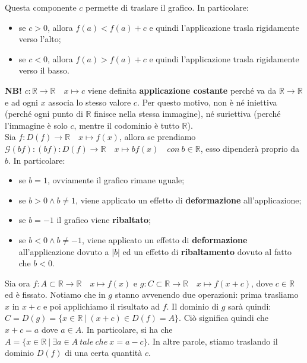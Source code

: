 \documentclass{article}
\begin{document}
\noindent Questa componente $c$ permette di traslare il grafico. In particolare:

\begin{itemize}
    \item se $c > 0$, allora $f(a) < f(a) + c$ e quindi l'applicazione trasla rigidamente verso l'alto;
    \item se $c < 0$, allora $f(a) > f(a) + c$ e quindi l'applicazione trasla rigidamente verso il basso.
\end{itemize}

\noindent\textbf{NB!} $c: \mathbb{R} \xrightarrow{} \mathbb{R} \quad x \longmapsto c$ viene definita \textbf{applicazione costante} perché va da $\mathbb{R} \xrightarrow{} \mathbb{R}$ e ad ogni $x$ associa lo stesso valore $c$. Per questo motivo, non è né iniettiva (perché ogni punto di $\mathbb{R}$ finisce nella stessa immagine), né suriettiva (perché l'immagine è solo $c$, mentre il codominio è tutto $\mathbb{R}$).\\

\noindent Sia $f: D(f) \xrightarrow{} \mathbb{R} \quad x \longmapsto f(x)$, allora se prendiamo $\mathcal{G}(bf): (bf): D(f) \xrightarrow{} \mathbb{R} \quad x \longmapsto bf(x) \quad con \ b \in \mathbb{R}$, esso dipenderà proprio da $b$. In particolare: 

\begin{itemize}
    \item se $b = 1$, ovviamente il grafico rimane uguale;
    \item se $b > 0 \wedge b \neq 1$, viene applicato un effetto di \textbf{deformazione} all'applicazione;
    \item se $b = -1$ il grafico viene \textbf{ribaltato};
    \item se $b < 0 \wedge b \neq -1$, viene applicato un effetto di \textbf{deformazione} all'applicazione dovuto a $|b|$ ed un effetto di \textbf{ribaltamento} dovuto al fatto che $b < 0$.
\end{itemize}

\noindent Sia ora $f: A \subset \mathbb{R} \xrightarrow{} \mathbb{R} \quad x \longmapsto f(x)$ e $g: C \subset \mathbb{R} \xrightarrow{} \mathbb{R} \quad x \longmapsto f(x + c)$, dove $c \in \mathbb{R}$ ed è fissato. Notiamo che in $g$ stanno avvenendo due operazioni: prima trasliamo $x$ in $x + c$ e poi applichiamo il risultato ad $f$. Il dominio di $g$ sarà quindi: $C = D(g) = \{x \in \mathbb{R} \ | \ (x + c) \in D(f) = A\}$. Ciò significa quindi che $x+c = a$ dove $a \in A$. In particolare, si ha che $A = \{x \in \mathbb{R} \ | \ \exists a \in A \ tale \ che \ x = a -c\}$. In altre parole, stiamo traslando il dominio $D(f)$ di una certa quantità $c$. \\
\end{document}
